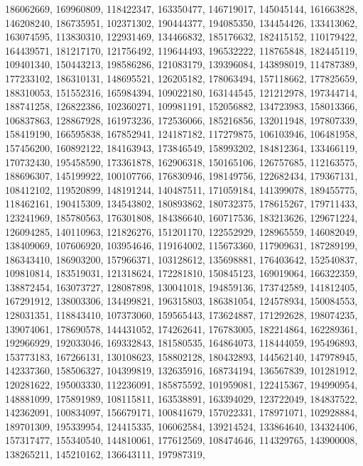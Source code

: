 {{    186062669, 169960809, 118422347, 163350477, 146719017, 145045144,
    161663828, 146208240, 186735951, 102371302, 190444377, 194085350,
    134454426, 133413062, 163074595, 113830310, 122931469, 134466832,
    185176632, 182415152, 110179422, 164439571, 181217170, 121756492,
    119644493, 196532222, 118765848, 182445119, 109401340, 150443213,
    198586286, 121083179, 139396084, 143898019, 114787389, 177233102,
    186310131, 148695521, 126205182, 178063494, 157118662, 177825659,
    188310053, 151552316, 165984394, 109022180, 163144545, 121212978,
    197344714, 188741258, 126822386, 102360271, 109981191, 152056882,
    134723983, 158013366, 106837863, 128867928, 161973236, 172536066,
    185216856, 132011948, 197807339, 158419190, 166595838, 167852941,
    124187182, 117279875, 106103946, 106481958, 157456200, 160892122,
    184163943, 173846549, 158993202, 184812364, 133466119, 170732430,
    195458590, 173361878, 162906318, 150165106, 126757685, 112163575,
    188696307, 145199922, 100107766, 176830946, 198149756, 122682434,
    179367131, 108412102, 119520899, 148191244, 140487511, 171059184,
    141399078, 189455775, 118462161, 190415309, 134543802, 180893862,
    180732375, 178615267, 179711433, 123241969, 185780563, 176301808,
    184386640, 160717536, 183213626, 129671224, 126094285, 140110963,
    121826276, 151201170, 122552929, 128965559, 146082049, 138409069,
    107606920, 103954646, 119164002, 115673360, 117909631, 187289199,
    186343410, 186903200, 157966371, 103128612, 135698881, 176403642,
    152540837, 109810814, 183519031, 121318624, 172281810, 150845123,
    169019064, 166322359, 138872454, 163073727, 128087898, 130041018,
    194859136, 173742589, 141812405, 167291912, 138003306, 134499821,
    196315803, 186381054, 124578934, 150084553, 128031351, 118843410,
    107373060, 159565443, 173624887, 171292628, 198074235, 139074061,
    178690578, 144431052, 174262641, 176783005, 182214864, 162289361,
    192966929, 192033046, 169332843, 181580535, 164864073, 118444059,
    195496893, 153773183, 167266131, 130108623, 158802128, 180432893,
    144562140, 147978945, 142337360, 158506327, 104399819, 132635916,
    168734194, 136567839, 101281912, 120281622, 195003330, 112236091,
    185875592, 101959081, 122415367, 194990954, 148881099, 175891989,
    108115811, 163538891, 163394029, 123722049, 184837522, 142362091,
    100834097, 156679171, 100841679, 157022331, 178971071, 102928884,
    189701309, 195339954, 124415335, 106062584, 139214524, 133864640,
    134324406, 157317477, 155340540, 144810061, 177612569, 108474646,
    114329765, 143900008, 138265211, 145210162, 136643111, 197987319,
}}
